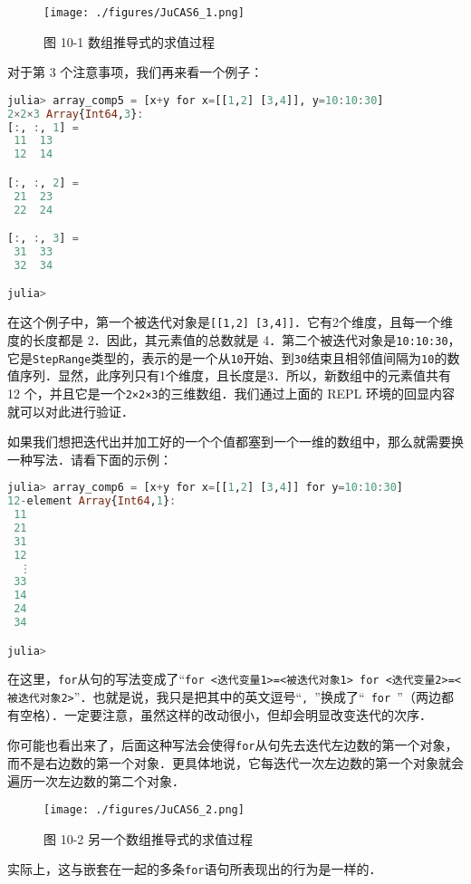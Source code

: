 \begin{figure}[ht]
\centering
\texttt{[image: ./figures/JuCAS6\_1.png]}
\caption{图 10-1 数组推导式的求值过程} \label{JuCAS6_fig1}
\end{figure}

对于第 3 个注意事项，我们再来看一个例子：

\begin{lstlisting}[language=julia]
julia> array_comp5 = [x+y for x=[[1,2] [3,4]], y=10:10:30]
2×2×3 Array{Int64,3}:
[:, :, 1] =
 11  13
 12  14

[:, :, 2] =
 21  23
 22  24

[:, :, 3] =
 31  33
 32  34

julia> 
\end{lstlisting}

在这个例子中，第一个被迭代对象是\verb|[[1,2] [3,4]]|．它有2个维度，且每一个维度的长度都是 2．因此，其元素值的总数就是 4．第二个被迭代对象是\verb|10:10:30|，它是\verb|StepRange|类型的，表示的是一个从\verb|10|开始、到\verb|30|结束且相邻值间隔为\verb|10|的数值序列．显然，此序列只有1个维度，且长度是3．所以，新数组中的元素值共有 12 个，并且它是一个\verb|2×2×3|的三维数组．我们通过上面的 REPL 环境的回显内容就可以对此进行验证．

如果我们想把迭代出并加工好的一个个值都塞到一个一维的数组中，那么就需要换一种写法．请看下面的示例：

\begin{lstlisting}[language=julia]
julia> array_comp6 = [x+y for x=[[1,2] [3,4]] for y=10:10:30]
12-element Array{Int64,1}:
 11
 21
 31
 12
  ⋮
 33
 14
 24
 34

julia> 
\end{lstlisting}

在这里，\verb|for|从句的写法变成了“\verb|for <迭代变量1>=<被迭代对象1> for <迭代变量2>=<被迭代对象2>|”．也就是说，我只是把其中的英文逗号“\verb|, |”换成了“\verb| for |”（两边都有空格）．一定要注意，虽然这样的改动很小，但却会明显改变迭代的次序．

你可能也看出来了，后面这种写法会使得\verb|for|从句先去迭代左边数的第一个对象，而不是右边数的第一个对象．更具体地说，它每迭代一次左边数的第一个对象就会遍历一次左边数的第二个对象．

\begin{figure}[ht]
\centering
\texttt{[image: ./figures/JuCAS6\_2.png]}
\caption{图 10-2 另一个数组推导式的求值过程} \label{JuCAS6_fig2}
\end{figure}

实际上，这与嵌套在一起的多条\verb|for|语句所表现出的行为是一样的．

